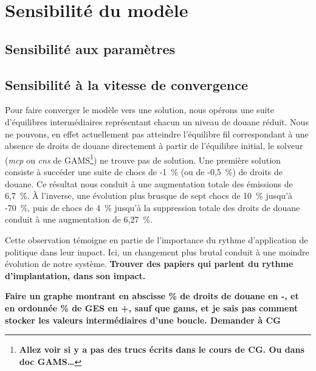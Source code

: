 \section{Sensibilité du modèle}

\subsection{Sensibilité aux paramètres}

\subsection{Sensibilité à la vitesse de convergence}\label{subsec:vit_cvg}

Pour faire converger le modèle vers une solution, nous opérons une suite d'équilibres intermédiaires représentant chacun un niveau de douane réduit. Nous ne pouvons, en effet actuellement pas atteindre l'équilibre fil correspondant à une absence de droits de douane directement à partir de l'équilibre initial, le solveur (\textit{mcp} ou \textit{cns} de GAMS\footnote{\textbf{Allez voir si y a pas des trucs écrits dans le cours de CG. Ou dans doc GAMS\dots}}) ne trouve pas de solution. Une première solution consiste à succéder une suite de chocs de -1~\% (ou de -0,5~\%) de droits de douane. Ce résultat nous conduit à une augmentation totale des émissions de 6,7~\%. À l'inverse, une évolution plus brusque de sept chocs de 10~\% jusqu'à -70~\%, puis de chocs de 4~\% jusqu'à la suppression totale des droits de douane conduit à une augmentation de 6,27~\%.

Cette observation témoigne en partie de l'importance du rythme d'application de politique dans leur impact. Ici, un changement plus brutal conduit à une moindre évolution de notre système. \textbf{Trouver des papiers qui parlent du rythme d'implantation, dans son impact.}

\textbf{Faire un graphe montrant en abscisse \% de droits de douane en -, et en ordonnée \% de GES en +, sauf que gams, et je sais pas comment stocker les valeurs intermédiaires d'une boucle. Demander à CG}

